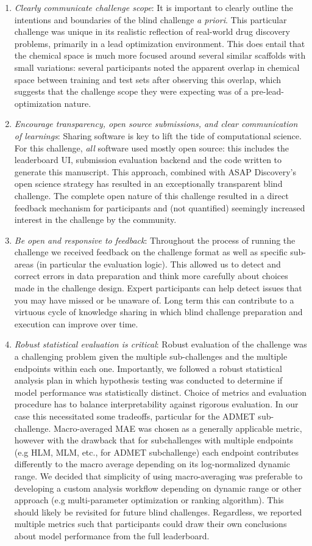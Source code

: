 \documentclass[journal=jcim,manuscript=article]{achemso}
\begin{document}
\begin{enumerate}
    \item \textit{Clearly communicate challenge scope}: It is important to clearly outline the intentions and boundaries of the blind challenge \textit{a priori}. This particular challenge was unique in its realistic reflection of real-world drug discovery problems, primarily in a lead optimization environment. This does entail that the chemical space is much more focused around several similar scaffolds with small variations: several participants noted the apparent overlap in chemical space between training and test sets after observing this overlap, which suggests that the challenge scope they were expecting was of a pre-lead-optimization nature. 
    \item \textit{Encourage transparency, open source submissions, and clear communication of learnings}: Sharing software is key to lift the tide of computational science. For this challenge, \textit{all} software used mostly open source: this includes the leaderboard UI, submission evaluation backend and the code written to generate this manuscript. This approach, combined with ASAP Discovery's open science strategy has resulted in an exceptionally transparent blind challenge. The complete open nature of this challenge resulted in a direct feedback mechanism for participants and (not quantified) seemingly increased interest in the challenge by the community.
    \item \textit{Be open and responsive to feedback}: Throughout the process of running the challenge we received feedback on the challenge format as well as specific sub-areas (in particular the evaluation logic). This allowed us to detect and correct errors in data preparation and think more carefully about choices made in the challenge design. Expert participants can help detect issues that you may have missed or be unaware of. Long term this can contribute to a virtuous cycle of knowledge sharing in which blind challenge preparation and execution can improve over time. 
    \item \textit{Robust statistical evaluation is critical}: Robust evaluation of the challenge was a challenging problem given the multiple sub-challenges and the multiple endpoints within each one. Importantly, we followed a robust statistical analysis plan in which hypothesis testing was conducted to determine if model performance was statistically distinct\cite{ash_practically_2024}.  Choice of metrics and evaluation procedure has to balance interpretability against rigorous evaluation. In our case this necessitated some tradeoffs, particular for the ADMET sub-challenge. Macro-averaged MAE was chosen as a generally applicable metric, however with the drawback that for subchallenges with multiple endpoints (e.g HLM, MLM, etc., for ADMET subchallenge) each endpoint contributes differently to the macro average depending on its log-normalized dynamic range.  We decided that simplicity of using macro-averaging was preferable to developing a custom analysis workflow depending on dynamic range or other approach (e.g multi-parameter optimization or ranking algorithm). This should likely be revisited for future blind challenges. Regardless, we reported multiple metrics such that participants could draw their own conclusions about model performance from the full leaderboard.

\end{enumerate}
\end{document}
